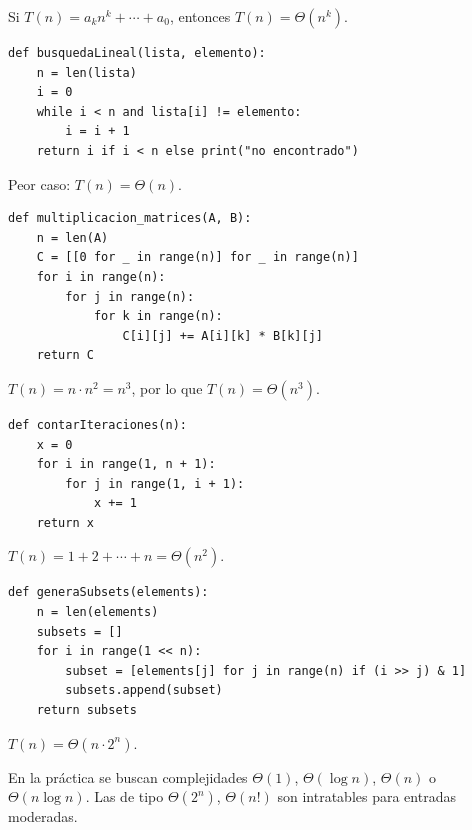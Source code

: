 \begin{observacion}
Si $T(n) = a_k n^k + \cdots + a_0$, entonces $T(n) = \Theta(n^k)$.
\end{observacion}

\begin{ejemplo}
\begin{lstlisting}[style=python]
def busquedaLineal(lista, elemento):
    n = len(lista)
    i = 0
    while i < n and lista[i] != elemento:
        i = i + 1
    return i if i < n else print("no encontrado")
\end{lstlisting}
Peor caso: $T(n) = \Theta(n)$.
\end{ejemplo}

\begin{ejemplo}
\begin{lstlisting}[style=python]
def multiplicacion_matrices(A, B):
    n = len(A)
    C = [[0 for _ in range(n)] for _ in range(n)]
    for i in range(n):
        for j in range(n):
            for k in range(n):
                C[i][j] += A[i][k] * B[k][j]
    return C
\end{lstlisting}
$T(n) = n \cdot n^2 = n^3$, por lo que $T(n) = \Theta(n^3)$.
\end{ejemplo}

\begin{ejemplo}
\begin{lstlisting}[style=python]
def contarIteraciones(n):
    x = 0
    for i in range(1, n + 1):
        for j in range(1, i + 1):
            x += 1
    return x
\end{lstlisting}
$T(n) = 1 + 2 + \cdots + n = \Theta(n^2)$.
\end{ejemplo}

\begin{ejemplo}[Subsets]
\begin{lstlisting}[style=python]
def generaSubsets(elements):
    n = len(elements)
    subsets = []
    for i in range(1 << n):
        subset = [elements[j] for j in range(n) if (i >> j) & 1]
        subsets.append(subset)
    return subsets
\end{lstlisting}
$T(n) = \Theta(n \cdot 2^n)$.
\end{ejemplo}

\begin{observacion}
En la práctica se buscan complejidades $\Theta(1)$, $\Theta(\log n)$, $\Theta(n)$ o $\Theta(n\log n)$. Las de tipo $\Theta(2^n)$, $\Theta(n!)$ son intratables para entradas moderadas.
\end{observacion}

